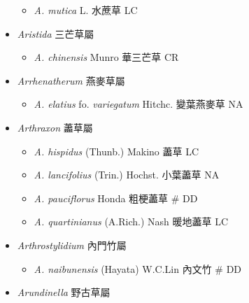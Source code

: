 \begin{itemize}
  \begin{itemize}
        \item[] \textit{A. mutica} L.  水蔗草   LC
  \end{itemize}
 \item[] \textit{Aristida} 三芒草屬
                                
  \begin{itemize}
        \item[] \textit{A. chinensis} Munro  華三芒草   CR
  \end{itemize}
 \item[] \textit{Arrhenatherum} 燕麥草屬
                                
  \begin{itemize}
        \item[] \textit{A. elatius} fo. \textit{variegatum} Hitchc.  變葉燕麥草   NA
  \end{itemize}
 \item[] \textit{Arthraxon} 藎草屬
                                
  \begin{itemize}
        \item[] \textit{A. hispidus} (Thunb.) Makino  藎草   LC
        \item[] \textit{A. lancifolius} (Trin.) Hochst.  小葉藎草   NA
        \item[] \textit{A. pauciflorus} Honda  粗梗藎草  \# DD
        \item[] \textit{A. quartinianus} (A.Rich.) Nash  暖地藎草   LC
  \end{itemize}
 \item[] \textit{Arthrostylidium} 內門竹屬
                                
  \begin{itemize}
        \item[] \textit{A. naibunensis} (Hayata) W.C.Lin  內文竹  \# DD
  \end{itemize}
 \item[] \textit{Arundinella} 野古草屬
                                

\end{itemize}
